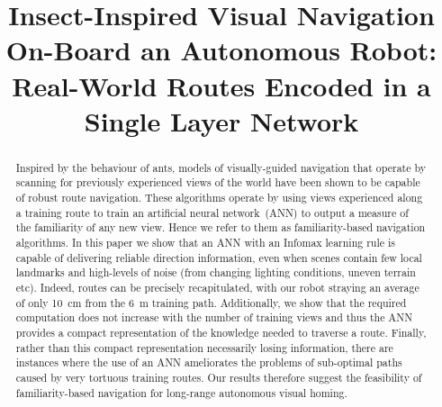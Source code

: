 \documentclass[letterpaper]{article}
\title{Insect-Inspired Visual Navigation On-Board an Autonomous Robot:\\ Real-World Routes Encoded in a Single Layer Network}
\author{James C. Knight$^{1}$, Daniil Sakhapov$^{2}$, Norbert Domcsek$^{1}$, Alex Dewar$^{1}$,\\ 
{\Large Paul Graham$^{1}$, Thomas Nowotny$^{1}$ \and Andrew Philippides$^{1}$} \\
\mbox{}\\
$^1$Centre for Computational Neuroscience and Robotics, University of Sussex, Brighton, UK \\
$^2$Department of Computer Science, Tomsk State University, Tomsk, Russia \\
J.C.Knight@sussex.ac.uk} %
\begin{document}
\maketitle

\begin{abstract}
Inspired by the behaviour of ants, models of visually-guided navigation that operate by scanning for previously experienced views of the world have been shown to be capable of robust route navigation. 
These algorithms operate by using views experienced along a training route to train an artificial neural network~(ANN) to output a measure of the familiarity of any new view.
Hence we refer to them as familiarity-based navigation algorithms.
In this paper we show that an ANN with an Infomax learning rule is capable of delivering reliable direction information, even when scenes contain few local landmarks and high-levels of noise (from changing lighting conditions, uneven terrain etc). 
Indeed, routes can be precisely recapitulated, with our robot straying an average of only \SI{10}{\centi\metre} from the \SI{6}{\metre} training path. 
Additionally, we show that the required computation does not increase with the number of training views and thus the ANN provides a compact representation of the knowledge needed to traverse a route. 
Finally, rather than this compact representation necessarily losing information, there are instances where the use of an ANN ameliorates the problems of sub-optimal paths caused by very tortuous training routes. 
Our results therefore suggest the feasibility of familiarity-based navigation for long-range autonomous visual homing.
\end{abstract}
\end{document}
